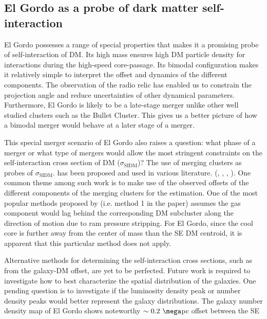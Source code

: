 \subsection{El Gordo as a probe of dark matter self-interaction}
El Gordo possesses a range of special properties that makes it a promising
probe of self-interaction of DM. Its high mass ensures high DM
particle density for interactions during the high-speed core-passage. Its bimodal configuration makes it
relatively simple to interpret the offset and dynamics of the different
components. The observation of the radio relic has enabled us to
constrain the projection angle and reduce uncertainties of other dynamical
parameters. Furthermore, El Gordo is likely to be a late-stage merger
unlike other well studied clusters such as the Bullet Cluster. This gives
us a better picture of how a bimodal merger would behave at a later stage of a merger. \par 
This special merger scenario of El Gordo also raises a question: what phase
of a merger or what type of mergers would allow the most stringent
constraints on the self-interaction cross section of DM ($\sigma_{\text{SIDM}}$)? 
The use of merging clusters as probes of $\sigma_{\text{SIDM}}$. 
has been proposed and used in various literature.
(\citealt{Markevitch2004}, \citealt{Randall2008d}, \citealt{Merten2011},
\citealt{Dawson12}). One common theme among such work is
to make use of the observed offsets of the different components of the
merging clusters for the estimation. One of the most popular methods proposed by
\citealt{Markevitch2004} (i.e. method 1 in the paper) assumes the gas component would lag behind the corresponding DM
subcluster along the direction of motion due to ram pressure stripping.   
For El Gordo, since the cool core is further away from the
center of mass than the SE DM centroid, it is apparent that this particular
method does not apply.\par 
Alternative methods for determining the self-interaction cross sections,
such as from the galaxy-DM offset, are yet to be perfected. Future work is
required to investigate how to best characterize the spatial distribution
of the galaxies. One pending question is to investigate if the luminosity
density peak or number density peaks would better represent the galaxy
distributions. The galaxy number density map of El Gordo
 shows noteworthy $\sim0.2~\mega$pc offset between the SE
